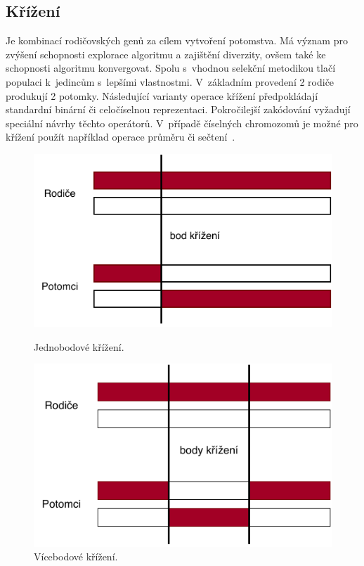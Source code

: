 \subsection{Křížení}
Je kombinací rodičovských genů za cílem vytvoření potomstva. Má význam pro zvýšení schopnosti explorace algoritmu a zajištění diverzity, ovšem také ke schopnosti algoritmu konvergovat. Spolu s~vhodnou selekční metodikou tlačí populaci k~jedincům s~lepšími vlastnostmi. V~základním provedení 2 rodiče produkují 2 potomky. Následující varianty operace křížení předpokládají standardní binární či celočíselnou reprezentaci. Pokročilejší zakódování vyžadují speciální návrhy těchto operátorů. V~případě číselných chromozomů je možné pro křížení použít například operace průměru či sečtení~\cite{EVO, Weisser2010}. 

\begin{figure}[!tbp]
\begin{minipage}[b]{0.485\linewidth}
\includegraphics[width=\linewidth]{obrazky-figures/cross_onepoint.pdf}
\caption{Jednobodové křížení.}
\label{fig:EA_1Cross}
\end{minipage}
\hfill
\begin{minipage}[b]{0.485\linewidth}
\includegraphics[width=\linewidth]{obrazky-figures/cross_multipoint.pdf}
\caption{Vícebodové křížení.}
\label{fig:EA_2Cross}
\end{minipage}
\end{figure}

